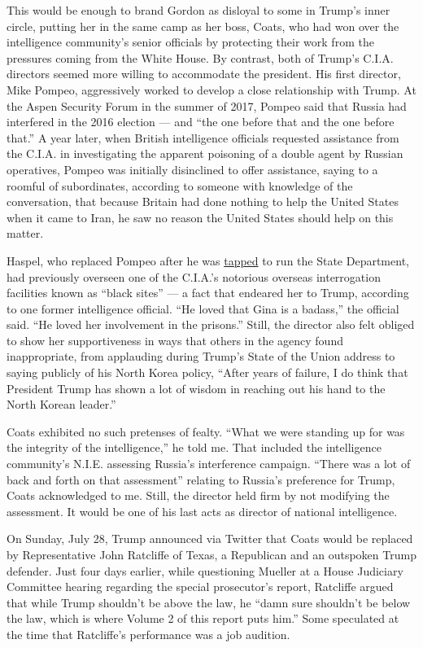 This would be enough to brand Gordon as disloyal to some in Trump's
inner circle, putting her in the same camp as her boss, Coats, who had
won over the intelligence community's senior officials by protecting
their work from the pressures coming from the White House. By contrast,
both of Trump's C.I.A. directors seemed more willing to accommodate the
president. His first director, Mike Pompeo, aggressively worked to
develop a close relationship with Trump. At the Aspen Security Forum in
the summer of 2017, Pompeo said that Russia had interfered in the 2016
election --- and ``the one before that and the one before that.'' A year
later, when British intelligence officials requested assistance from the
C.I.A. in investigating the apparent poisoning of a double agent by
Russian operatives, Pompeo was initially disinclined to offer
assistance, saying to a roomful of subordinates, according to someone
with knowledge of the conversation, that because Britain had done
nothing to help the United States when it came to Iran, he saw no reason
the United States should help on this matter.

Haspel, who replaced Pompeo after he was
\href{https://www.nytimes.com/2019/02/26/magazine/mike-pompeo-translates-trump.html}{tapped}
to run the State Department, had previously overseen one of the C.I.A.'s
notorious overseas interrogation facilities known as ``black sites'' ---
a fact that endeared her to Trump, according to one former intelligence
official. ``He loved that Gina is a badass,'' the official said. ``He
loved her involvement in the prisons.'' Still, the director also felt
obliged to show her supportiveness in ways that others in the agency
found inappropriate, from applauding during Trump's State of the Union
address to saying publicly of his North Korea policy, ``After years of
failure, I do think that President Trump has shown a lot of wisdom in
reaching out his hand to the North Korean leader.''

Coats exhibited no such pretenses of fealty. ``What we were standing up
for was the integrity of the intelligence,'' he told me. That included
the intelligence community's N.I.E. assessing Russia's interference
campaign. ``There was a lot of back and forth on that assessment''
relating to Russia's preference for Trump, Coats acknowledged to me.
Still, the director held firm by not modifying the assessment. It would
be one of his last acts as director of national intelligence.

On Sunday, July 28, Trump announced via Twitter that Coats would be
replaced by Representative John Ratcliffe of Texas, a Republican and an
outspoken Trump defender. Just four days earlier, while questioning
Mueller at a House Judiciary Committee hearing regarding the special
prosecutor's report, Ratcliffe argued that while Trump shouldn't be
above the law, he ``damn sure shouldn't be below the law, which is where
Volume 2 of this report puts him.'' Some speculated at the time that
Ratcliffe's performance was a job audition.

